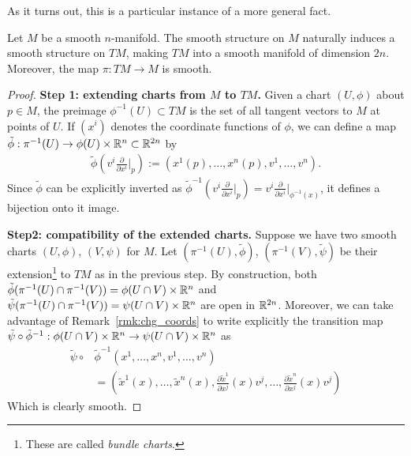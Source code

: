 As it turns out, this is a particular instance of a more general fact.

\begin{thm}
    Let $M$ be a smooth $n$-manifold.
    The smooth structure on $M$ naturally induces a smooth structure on $TM$, making $TM$ into a smooth manifold of dimension $2n$.
    Moreover, the map $\pi: TM \to M$ is smooth.
\end{thm}
\begin{proof}
    \textbf{Step 1: extending charts from $M$ to $TM$.}
    Given a chart $(U,\phi)$ about $p\in M$, the preimage $\phi^{-1}(U) \subset TM$ is the set of all tangent vectors to $M$ at points of $U$.
    If $(x^i)$ denotes the coordinate functions of $\phi$, we can define a map $\tilde\phi : \pi^{-1}(U) \to \phi(U)\times\mathbb{R}^n \subset \mathbb{R}^{2n}$ by
    \begin{align}\label{eq:nat_coords}
        \tilde\phi\left(v^i \frac{\partial}{\partial x^i}\Big|_p\right) := \left(x^1(p), \ldots, x^n(p), v^1, \ldots, v^n\right).
    \end{align}
    Since $\tilde\phi$ can be explicitly inverted as $\tilde\phi^{-1}\left(v^i \frac{\partial}{\partial x^i}\Big|_p\right) = v^i \frac{\partial}{\partial x^i}\Big|_{\phi^{-1}(x)}$, it defines a bijection onto it image.

    \textbf{Step2: compatibility of the extended charts.}
    Suppose we have two smooth charts $(U,\phi)$, $(V,\psi)$ for $M$.
    Let $(\pi^{-1}(U),\tilde\phi)$, $(\pi^{-1}(V),\tilde\psi)$ be their extension\footnote{These are called \emph{bundle charts}.} to $TM$ as in the previous step.
    By construction, both $\tilde\phi(\pi^{-1}(U)\cap\pi^{-1}(V)) = \phi(U\cap V)\times\mathbb{R}^n$ and $\tilde\psi(\pi^{-1}(U)\cap\pi^{-1}(V)) = \psi(U\cap V)\times\mathbb{R}^n$ are open in $\mathbb{R}^{2n}$.
    Moreover, we can take advantage of Remark~\ref{rmk:chg_coords} to write explicitly the transition map  $\tilde\psi\circ\tilde\phi^{-1}: \phi(U\cap V)\times\mathbb{R}^n \to \psi(U\cap V)\times\mathbb{R}^n$ as
    \begin{align}
        \tilde\psi\circ&\tilde\phi^{-1}\left(x^1, \ldots, x^n, v^1, \ldots, v^n\right) \\
        &=\left(\tilde x^1(x),\ldots, \tilde x^n(x), \frac{\partial \tilde x^1}{\partial x^j}(x) v^j, \ldots, \frac{\partial \tilde x^n}{\partial x^j}(x) v^j\right)
    \end{align}
    Which is clearly smooth.


\end{proof}
